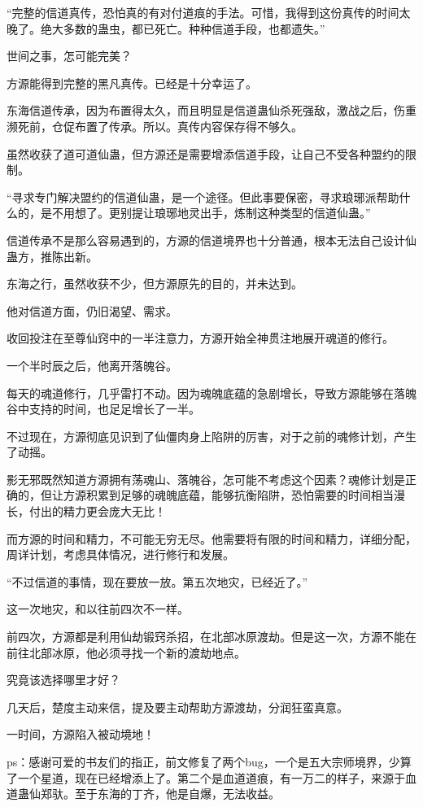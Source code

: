 \begin{this_body}
“完整的信道真传，恐怕真的有对付道痕的手法。可惜，我得到这份真传的时间太晚了。绝大多数的蛊虫，都已死亡。种种信道手段，也都遗失。”

世间之事，怎可能完美？

方源能得到完整的黑凡真传。已经是十分幸运了。

东海信道传承，因为布置得太久，而且明显是信道蛊仙杀死强敌，激战之后，伤重濒死前，仓促布置了传承。所以。真传内容保存得不够久。

虽然收获了道可道仙蛊，但方源还是需要增添信道手段，让自己不受各种盟约的限制。

“寻求专门解决盟约的信道仙蛊，是一个途径。但此事要保密，寻求琅琊派帮助什么的，是不用想了。更别提让琅琊地灵出手，炼制这种类型的信道仙蛊。”

信道传承不是那么容易遇到的，方源的信道境界也十分普通，根本无法自己设计仙蛊方，推陈出新。

东海之行，虽然收获不少，但方源原先的目的，并未达到。

他对信道方面，仍旧渴望、需求。

收回投注在至尊仙窍中的一半注意力，方源开始全神贯注地展开魂道的修行。

一个半时辰之后，他离开落魄谷。

每天的魂道修行，几乎雷打不动。因为魂魄底蕴的急剧增长，导致方源能够在落魄谷中支持的时间，也足足增长了一半。

不过现在，方源彻底见识到了仙僵肉身上陷阱的厉害，对于之前的魂修计划，产生了动摇。

影无邪既然知道方源拥有荡魂山、落魄谷，怎可能不考虑这个因素？魂修计划是正确的，但让方源积累到足够的魂魄底蕴，能够抗衡陷阱，恐怕需要的时间相当漫长，付出的精力更会庞大无比！

而方源的时间和精力，不可能无穷无尽。他需要将有限的时间和精力，详细分配，周详计划，考虑具体情况，进行修行和发展。

“不过信道的事情，现在要放一放。第五次地灾，已经近了。”

这一次地灾，和以往前四次不一样。

前四次，方源都是利用仙劫锻窍杀招，在北部冰原渡劫。但是这一次，方源不能在前往北部冰原，他必须寻找一个新的渡劫地点。

究竟该选择哪里才好？

几天后，楚度主动来信，提及要主动帮助方源渡劫，分润狂蛮真意。

一时间，方源陷入被动境地！

ps：感谢可爱的书友们的指正，前文修复了两个bug，一个是五大宗师境界，少算了一个星道，现在已经增添上了。第二个是血道道痕，有一万二的样子，来源于血道蛊仙郑驮。至于东海的丁齐，他是自爆，无法收益。

\end{this_body}

